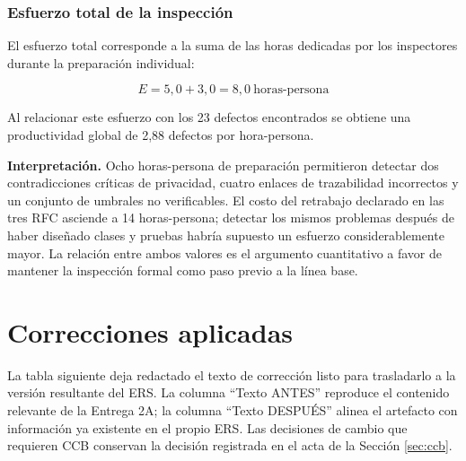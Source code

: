 \documentclass[journal,onecolumn]{IEEEtran}
\begin{document}
	\subsubsection{Esfuerzo total de la inspección}
	
	El esfuerzo total corresponde a la suma de las horas dedicadas por los inspectores durante la
	preparación individual:
	
	\begin{equation*}
		E = 5{,}0 + 3{,}0 = 8{,}0~\text{horas-persona}
	\end{equation*}
	
	Al relacionar este esfuerzo con los 23 defectos encontrados se obtiene una productividad global de
	2,88 defectos por hora-persona.
	
	\textbf{Interpretación.} Ocho horas-persona de preparación permitieron detectar dos
	contradicciones críticas de privacidad, cuatro enlaces de trazabilidad incorrectos y un conjunto
	de umbrales no verificables. El costo del retrabajo declarado en las tres RFC asciende a 14
	horas-persona; detectar los mismos problemas después de haber diseñado clases y pruebas habría
	supuesto un esfuerzo considerablemente mayor. La relación entre ambos valores es el argumento
	cuantitativo a favor de mantener la inspección formal como paso previo a la línea base.
	\newpage
	\section{Correcciones aplicadas}
	\label{sec:correcciones}
	
	La tabla siguiente deja redactado el texto de corrección listo para trasladarlo a la versión
	resultante del ERS. La columna ``Texto ANTES'' reproduce el contenido relevante de la Entrega 2A;
	la columna ``Texto DESPUÉS'' alinea el artefacto con información ya existente en el propio ERS.
	Las decisiones de cambio que requieren CCB conservan la decisión registrada en el acta de la
	Sección \ref{sec:ccb}.
	
\end{document}
